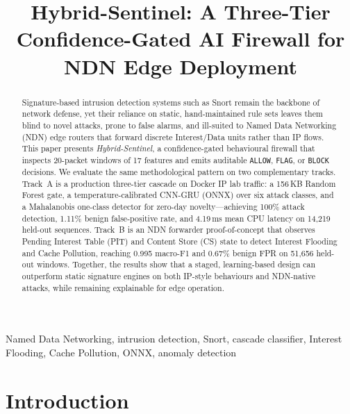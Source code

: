 \documentclass[conference]{IEEEtran}
\begin{document}
\title{Hybrid-Sentinel: A Three-Tier Confidence-Gated AI Firewall for NDN Edge Deployment}

\author{
}

\maketitle

\begin{abstract}
Signature-based intrusion detection systems such as Snort remain the backbone of network defense, yet their reliance on static, hand-maintained rule sets leaves them blind to novel attacks, prone to false alarms, and ill-suited to Named Data Networking (NDN) edge routers that forward discrete Interest/Data units rather than IP flows. This paper presents \textit{Hybrid-Sentinel}, a confidence-gated behavioural firewall that inspects 20-packet windows of 17 features and emits auditable \texttt{ALLOW}, \texttt{FLAG}, or \texttt{BLOCK} decisions. We evaluate the same methodological pattern on two complementary tracks. Track~A is a production three-tier cascade on Docker IP lab traffic: a 156\,KB Random Forest gate, a temperature-calibrated CNN-GRU (ONNX) over six attack classes, and a Mahalanobis one-class detector for zero-day novelty---achieving 100\% attack detection, 1.11\% benign false-positive rate, and 4.19\,ms mean CPU latency on 14{,}219 held-out sequences. Track~B is an NDN forwarder proof-of-concept that observes Pending Interest Table (PIT) and Content Store (CS) state to detect Interest Flooding and Cache Pollution, reaching 0.995 macro-F1 and 0.67\% benign FPR on 51{,}656 held-out windows. Together, the results show that a staged, learning-based design can outperform static signature engines on both IP-style behaviours and NDN-native attacks, while remaining explainable for edge operation.
\end{abstract}

\begin{IEEEkeywords}
Named Data Networking, intrusion detection, Snort, cascade classifier, Interest Flooding, Cache Pollution, ONNX, anomaly detection
\end{IEEEkeywords}

\section{Introduction}
\label{sec:intro}
\end{document}
